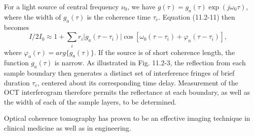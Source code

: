\documentclass{article}
\numberwithin{figure}{subsection}
\numberwithin{table}{subsection}
\begin{document}
\par For a light source of central frequency $ \nu_0 $, we have $ g(\tau) = g_a (\tau) \exp(j\omega_0 \tau) $, where the width of $ g_a (\tau) $ is the coherence time $ \tau_c $. Equation (11.2-11) then becomes
\begin{equation}
I / 2I_0 \approx 1 + \sum_i r_i \lvert g_a (\tau - \tau_i) \rvert \cos [\omega_0 (\tau - \tau_i) + \varphi_a (\tau - \tau_i)] ,
\end{equation}
where $ \varphi_a (r) = arg\{g_a ( \tau )\} $. If the source is of short coherence length, the function $ g_a (\tau) $ is narrow. As illustrated in Fig. 11.2-3, the reflection from each sample boundary then generates a distinct set of interference fringes of brief duration $ \tau_c $, centered about its corresponding time delay. Measurement of the OCT interferogram therefore permits the reflectance at each boundary, as well as the width of each of the sample layers, to be determined.
\par Optical coherence tomography has proven to be an effective imaging technique in clinical medicine as well as in engineering.

\bigbreak\begingroup
\color{ksc}
\end{document}
